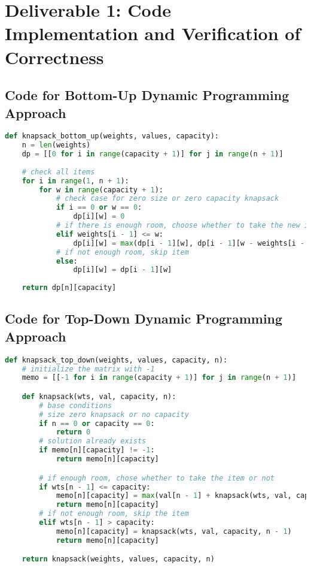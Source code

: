 \documentclass{article}
\begin{document}
\section{Deliverable 1: Code Implementation and Verification of Correctness}
\subsection{Code for Bottom-Up Dynamic Programming Approach}
\begin{lstlisting}[language=Python]
def knapsack_bottom_up(weights, values, capacity):
    n = len(weights)
    dp = [[0 for i in range(capacity + 1)] for j in range(n + 1)]
    
    # check all items
    for i in range(1, n + 1):
        for w in range(capacity + 1):
            # check case for zero size or zero capacity knapsack
            if i == 0 or w == 0:
                dp[i][w] = 0
            # if there is enough room, choose whether to take the new item or not
            elif weights[i - 1] <= w:
                dp[i][w] = max(dp[i - 1][w], dp[i - 1][w - weights[i - 1]] + values[i - 1])
            # if not enough room, skip item
            else:
                dp[i][w] = dp[i - 1][w]
    
    return dp[n][capacity]
\end{lstlisting}

\subsection{Code for Top-Down Dynamic Programming Approach}
\begin{lstlisting}[language=Python]
def knapsack_top_down(weights, values, capacity, n):
    # initialize the matrix with -1
    memo = [[-1 for i in range(capacity + 1)] for j in range(n + 1)]

    def knapsack(wts, val, capacity, n): 
        # base conditions
        # size zero knapsack or no capacity
        if n == 0 or capacity == 0:
            return 0
        # solution already exists
        if memo[n][capacity] != -1:
            return memo[n][capacity]

        # if enough room, chose whether to take the item or not
        if wts[n - 1] <= capacity:
            memo[n][capacity] = max(val[n - 1] + knapsack(wts, val, capacity - wts[n - 1], n - 1), knapsack(wts, val, capacity, n - 1))
            return memo[n][capacity]
        # if not enough room, skip the item
        elif wts[n - 1] > capacity:
            memo[n][capacity] = knapsack(wts, val, capacity, n - 1)
            return memo[n][capacity]

    return knapsack(weights, values, capacity, n)
\end{lstlisting}
\end{document}
